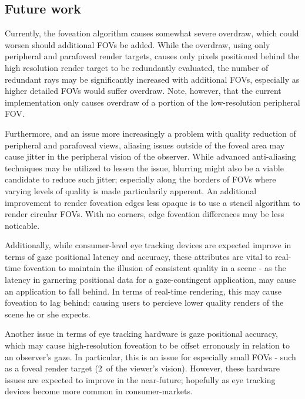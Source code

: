 \subsection{Future work}
Currently, the foveation algorithm causes somewhat severe overdraw, which could worsen should additional FOVs be added.
While the overdraw, using only peripheral and parafoveal render targets, causes only pixels positioned behind the high resolution render target to be redundantly evaluated, the number of redundant rays may be significantly increased with additional FOVs, especially as higher detailed FOVs would suffer overdraw.
Note, however, that the current implementation only causes overdraw of a portion of the low-resolution peripheral FOV.

Furthermore, and an issue more increasingly a problem with quality reduction of peripheral and parafoveal views, aliasing issues outside of the foveal area may cause jitter in the peripheral vision of the observer.
While advanced anti-aliasing techniques may be utilized to lessen the issue, blurring might also be a viable candidate to reduce such jitter; especially along the borders of FOVs where varying levels of quality is made particularily apperent.
An additional improvement to render foveation edges less opaque is to use a stencil algorithm to render circular FOVs.
With no corners, edge foveation differences may be less noticable.

Additionally, while consumer-level eye tracking devices are expected improve in terms of gaze positional latency and accuracy, these attributes are vital to real-time foveation to maintain the illusion of consistent quality in a scene - as the latency in garnering positional data for a gaze-contingent application, may cause an application to fall behind.
In terms of real-time rendering, this may cause foveation to lag behind; causing users to percieve lower quality renders of the scene he or she expects.

Another issue in terms of eye tracking hardware is gaze positional accuracy, which may cause high-resolution foveation to be offset erronously in relation to an observer's gaze.
In particular, this is an issue for especially small FOVs - such as a foveal render target ($2$\degree\ of the viewer's vision).
However, these hardware issues are expected to improve in the near-future; hopefully as eye tracking devices become more common in consumer-markets.
